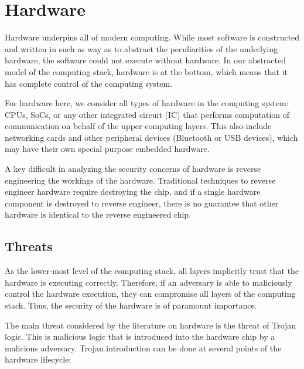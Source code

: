 \documentclass[11pt,letterpaper]{article}
\begin{document}
\section{Hardware}

Hardware underpins all of modern computing. While most software is
constructed and written in such as way as to abstract the
peculiarities of the underlying hardware, the software could not
execute without hardware. In our abstracted model of the computing
stack, hardware is at the bottom, which means that it has complete
control of the computing system.

For hardware here, we consider all types of hardware in the computing
system: CPUs, SoCs, or any other integrated circuit (IC) that performs
computation of communication on behalf of the upper computing layers.
This also include networking cards and other peripheral devices
(Bluetooth or USB devices), which may have their own special purpose
embedded hardware.

A key difficult in analyzing the security concerns of hardware is
reverse engineering the workings of the hardware. Traditional
techniques to reverse engineer hardware require destroying the chip,
and if a single hardware component is destroyed to reverse engineer,
there is no guarantee that other hardware is identical to the reverse
engineered chip.

\subsection{Threats}

As the lower-most level of the computing stack, all layers implicitly
trust that the hardware is executing correctly. Therefore, if an
adversary is able to maliciously control the hardware execution, they
can compromise all layers of the computing stack. Thus, the security
of the hardware is of paramount importance.

The main threat considered by the literature on hardware is the threat
of Trojan logic. This is malicious logic that is introduced into the
hardware chip by a malicious adversary. Trojan introduction can be
done at several points of the hardware lifecycle:
\end{document}
